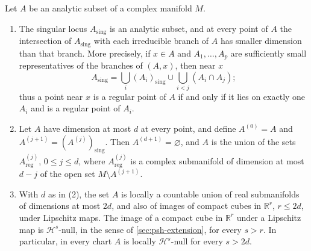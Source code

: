 \begin{corollary}\label{cor:analytic-strata-hausdorff}
Let $A$ be an analytic subset of a complex manifold $M$.
\begin{enumerate}
\item The singular locus $A_{\mathrm{sing}}$ is an analytic subset, and at every point of $A$ the intersection of $A_{\mathrm{sing}}$ with each irreducible branch of $A$ has smaller dimension than that branch. More precisely, if $x\in A$ and $A_1,\ldots,A_p$ are sufficiently small representatives of the branches of $(A,x)$, then near $x$
\[
 A_{\mathrm{sing}}=\bigcup_i(A_i)_{\mathrm{sing}}\cup\bigcup_{i<j}(A_i\cap A_j);
\]
thus a point near $x$ is a regular point of $A$ if and only if it lies on exactly one $A_i$ and is a regular point of $A_i$.
\item Let $A$ have dimension at most $d$ at every point, and define $A^{(0)}=A$ and $A^{(j+1)}=(A^{(j)})_{\mathrm{sing}}$. Then $A^{(d+1)}=\varnothing$, and $A$ is the union of the sets $A^{(j)}_{\mathrm{reg}}$, $0\leq j\leq d$, where $A^{(j)}_{\mathrm{reg}}$ is a complex submanifold of dimension at most $d-j$ of the open set $M\setminus A^{(j+1)}$.
\item With $d$ as in {\upshape(2)}, the set $A$ is locally a countable union of real submanifolds of dimensions at most $2d$, and also of images of compact cubes in $\mathbb R^r$, $r\leq2d$, under Lipschitz maps. The image of a compact cube in $\mathbb R^r$ under a Lipschitz map is $\mathcal H^s$-null, in the sense of \cref{sec:psh-extension}, for every $s>r$. In particular, in every chart $A$ is locally $\mathcal H^s$-null for every $s>2d$.
\end{enumerate}
\end{corollary}
